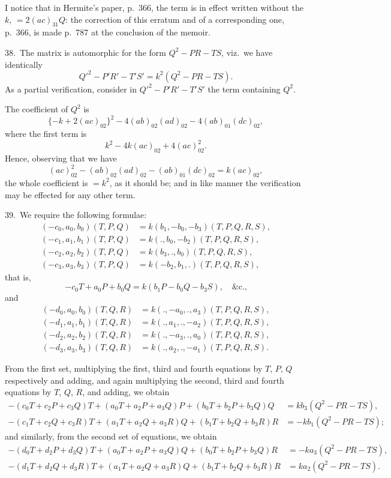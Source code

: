 \documentclass[11pt,a4paper]{article}
\theoremstyle{definition}
\begin{document}
I notice that in Hermite's paper, p.~366, the term is in effect written without the $k$, $= 2(ac)_{31}Q$: the correction of this erratum and of a corresponding one, p.~366, is made p.~787 at the conclusion of the memoir.

\medskip

38.\ The matrix is automorphic for the form $Q^2 - PR - TS$, viz.\ we have identically
\[
Q'^2 - P'R' - T'S' = k^2(Q^2 - PR - TS).
\]
As a partial verification, consider in $Q'^2 - P'R' - T'S'$ the term containing $Q^2$.

The coefficient of $Q^2$ is
\[
\{-k + 2(ac)_{02}\}^2 - 4(ab)_{02}(ad)_{02} - 4(ab)_{01}(dc)_{02},
\]
where the first term is
\[
k^2 - 4k(ac)_{02} + 4(ac)_{02}^2.
\]
Hence, observing that we have
\[
(ac)_{02}^2 - (ab)_{02}(ad)_{02} - (ab)_{01}(dc)_{02} = k(ac)_{02},
\]
the whole coefficient is $= k^2$, as it should be; and in like manner the verification may be effected for any other term.

\medskip

39.\ We require the following formulae:
\begin{align*}
(-c_0, a_0, b_0)(T, P, Q) &= k(b_1, -b_0, -b_3)(T, P, Q, R, S),\\
(-c_1, a_1, b_1)(T, P, Q) &= k(., b_0, -b_2)(T, P, Q, R, S),\\
(-c_2, a_2, b_2)(T, P, Q) &= k(b_3, ., b_0)(T, P, Q, R, S),\\
(-c_3, a_3, b_3)(T, P, Q) &= k(-b_2, b_1, .)(T, P, Q, R, S),
\end{align*}
that is,
\[
-c_0T + a_0P + b_0Q = k(b_1P - b_0Q - b_3S), \quad \text{\&c.,}
\]
and
\begin{align*}
(-d_0, a_0, b_0)(T, Q, R) &= k(., -a_0, ., a_3)(T, P, Q, R, S),\\
(-d_1, a_1, b_1)(T, Q, R) &= k(., a_1, ., -a_2)(T, P, Q, R, S),\\
(-d_2, a_2, b_2)(T, Q, R) &= k(., -a_3, ., a_0)(T, P, Q, R, S),\\
(-d_3, a_3, b_3)(T, Q, R) &= k(., a_2, ., -a_1)(T, P, Q, R, S).
\end{align*}

From the first set, multiplying the first, third and fourth equations by $T$, $P$, $Q$ respectively and adding, and again multiplying the second, third and fourth equations by $T$, $Q$, $R$, and adding, we obtain
\begin{align*}
-(c_0T + c_2P + c_3Q)T + (a_0T + a_2P + a_3Q)P + (b_0T + b_2P + b_3Q)Q &= kb_3(Q^2 - PR - TS),\\
-(c_1T + c_2Q + c_3R)T + (a_1T + a_2Q + a_3R)Q + (b_1T + b_2Q + b_3R)R &= -kb_1(Q^2 - PR - TS);
\end{align*}
and similarly, from the second set of equations, we obtain
\begin{align*}
-(d_0T + d_2P + d_3Q)T + (a_0T + a_2P + a_3Q)Q + (b_0T + b_2P + b_3Q)R &= -ka_3(Q^2 - PR - TS),\\
-(d_1T + d_2Q + d_3R)T + (a_1T + a_2Q + a_3R)Q + (b_1T + b_2Q + b_3R)R &= ka_2(Q^2 - PR - TS).
\end{align*}
\end{document}
